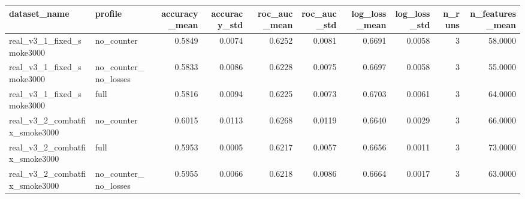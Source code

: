 \begin{tabular}{llrrrrrrrr}
\toprule
dataset_name & profile & accuracy_mean & accuracy_std & roc_auc_mean & roc_auc_std & log_loss_mean & log_loss_std & n_runs & n_features_mean \\
\midrule
real_v3_1_fixed_smoke3000 & no_counter & 0.5849 & 0.0074 & 0.6252 & 0.0081 & 0.6691 & 0.0058 & 3 & 58.0000 \\
real_v3_1_fixed_smoke3000 & no_counter_no_losses & 0.5833 & 0.0086 & 0.6228 & 0.0075 & 0.6697 & 0.0058 & 3 & 55.0000 \\
real_v3_1_fixed_smoke3000 & full & 0.5816 & 0.0094 & 0.6225 & 0.0073 & 0.6703 & 0.0061 & 3 & 64.0000 \\
real_v3_2_combatfix_smoke3000 & no_counter & 0.6015 & 0.0113 & 0.6268 & 0.0119 & 0.6640 & 0.0029 & 3 & 66.0000 \\
real_v3_2_combatfix_smoke3000 & full & 0.5953 & 0.0005 & 0.6217 & 0.0057 & 0.6656 & 0.0011 & 3 & 73.0000 \\
real_v3_2_combatfix_smoke3000 & no_counter_no_losses & 0.5955 & 0.0066 & 0.6218 & 0.0086 & 0.6664 & 0.0017 & 3 & 63.0000 \\
\bottomrule
\end{tabular}
